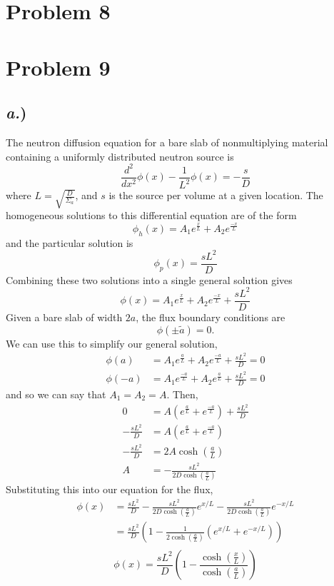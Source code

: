 \documentclass{article}
\newcommand{\Xs}{\Sigma}
\begin{document}

\section*{Problem 8}





\section*{Problem 9}

\subsection*{\textit{a.})}

The neutron diffusion equation for a bare slab of nonmultiplying material containing a uniformly distributed neutron source is 
$$ \frac{d^2}{dx^2}\phi(x) - \frac{1}{L^2}\phi(x) = -\frac{s}{D} $$
where $L = \sqrt{\frac{D}{\Xs_a}}$, and $s$ is the source per volume at a given location. The homogeneous solutions to this differential equation are of the form
$$ \phi_h(x) = A_1 e^{\frac{x}{L}} + A_2 e^{\frac{-x}{L}} $$
and the particular solution is
$$ \phi_p(x) = \frac{sL^2}{D} $$
Combining these two solutions into a single general solution gives
$$ \phi(x) = A_1 e^{\frac{x}{L}} + A_2 e^{\frac{-x}{L}} + \frac{sL^2}{D} $$
Given a bare slab of width $2a$, the flux boundary conditions are 
$$ \phi(\pm \tilde{a}) = 0 .$$
We can use this to simplify our general solution,
\begin{align*}
\phi(a)	&= A_1 e^{\frac{a}{L}} + A_2 e^{\frac{-a}{L}} + \frac{sL^2}{D} = 0 \\
\phi(-a)&= A_1 e^{\frac{-a}{L}} + A_2 e^{\frac{a}{L}} + \frac{sL^2}{D} = 0 
\end{align*}
and so we can say that $A_1 = A_2 = A$. Then,
\begin{align*}
0 &= A \left(e^{\frac{a}{L}} + e^{\frac{-a}{L}}\right) + \frac{sL^2}{D} \\
-\frac{sL^2}{D} &= A \left(e^{\frac{a}{L}} + e^{\frac{-a}{L}}\right) \\
-\frac{sL^2}{D} &= 2A \cosh\left(\frac{a}{L}\right) \\
A &= -\frac{sL^2}{2D\cosh\left(\frac{a}{L}\right)} 
\end{align*}
Substituting this into our equation for the flux,
\begin{align*}
\phi(x)	&= \frac{sL^2}{D} - \frac{sL^2}{2D\cosh\left(\frac{a}{L}\right)}e^{x/L} - \frac{sL^2}{2D\cosh\left(\frac{a}{L}\right)}e^{-x/L} \\
		&= \frac{sL^2}{D}\left(1-\frac{1}{2\cosh\left(\frac{a}{L}\right)} \left(e^{x/L} + e^{-x/L}\right)\right) \\
\end{align*}
$$\boxed{ \phi(x) = \frac{sL^2}{D}\left(1-\frac{\cosh\left(\frac{x}{L}\right)}{\cosh\left(\frac{a}{L}\right)}\right) }$$
\end{document}
